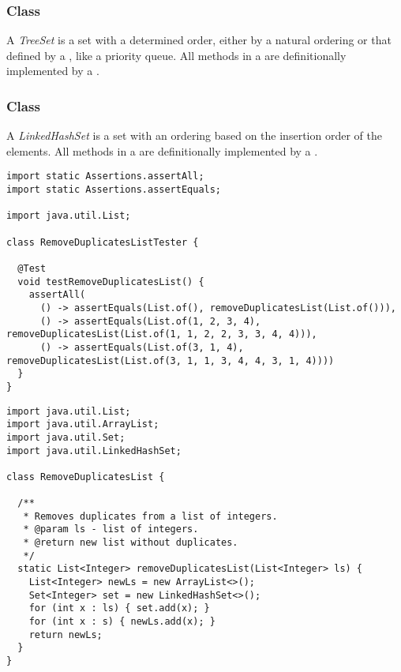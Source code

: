 \subsubsection*{ Class}
A \textit{TreeSet} is a set with a determined order, either by a natural ordering or that defined by a , like a priority queue. All methods in a  are definitionally implemented by a .

\subsubsection*{ Class}
A \textit{LinkedHashSet} is a set with an ordering based on the insertion order of the elements. All methods in a  are definitionally implemented by a .


\begin{cl}[]{}
\begin{lstlisting}[language=MyJava]
import static Assertions.assertAll;
import static Assertions.assertEquals;

import java.util.List;

class RemoveDuplicatesListTester {

  @Test
  void testRemoveDuplicatesList() {
    assertAll(
      () -> assertEquals(List.of(), removeDuplicatesList(List.of())),
      () -> assertEquals(List.of(1, 2, 3, 4), removeDuplicatesList(List.of(1, 1, 2, 2, 3, 3, 4, 4))),
      () -> assertEquals(List.of(3, 1, 4), removeDuplicatesList(List.of(3, 1, 1, 3, 4, 4, 3, 1, 4))))
  }
}
\end{lstlisting}
\end{cl}

\begin{cl}[]{}
\begin{lstlisting}[language=MyJava]
import java.util.List;
import java.util.ArrayList;
import java.util.Set;
import java.util.LinkedHashSet;

class RemoveDuplicatesList {

  /**
   * Removes duplicates from a list of integers.
   * @param ls - list of integers.
   * @return new list without duplicates.
   */
  static List<Integer> removeDuplicatesList(List<Integer> ls) {
    List<Integer> newLs = new ArrayList<>();
    Set<Integer> set = new LinkedHashSet<>();
    for (int x : ls) { set.add(x); }
    for (int x : s) { newLs.add(x); }
    return newLs;
  }
}
\end{lstlisting}
\end{cl}

